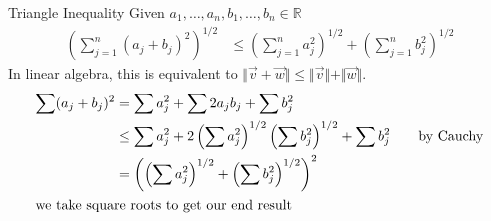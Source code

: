 \documentclass[10pt]{extarticle}
\newcommand{\R}{\mathbb{R}}
\begin{document}
  \begin{problem}{Triangle Inequality}
    Given $a_1,\dots,a_n,b_1,\dots,b_n\in\R$
    \begin{align*}
      \left(\sum_{j=1}^{n}(a_j + b_j)^2\right)^{1/2} &\leq \left(\sum_{j=1}^{n}a_j^2\right)^{1/2} + \left(\sum_{j=1}^{n}b_j^2\right)^{1/2}
    \end{align*}
    In linear algebra, this is equivalent to $\Vert\vec{v} + \vec{w}\Vert \leq \Vert\vec{v}\Vert + \Vert\vec{w}\Vert$.
    \tcblower
    \begin{align*}
      \sum (a_j + b_j)^2 &= \sum a_j^2 + \sum 2a_jb_j + \sum b_j^2\\
                         &\leq \sum a_j^2 + 2\left(\sum a_j^2\right)^{1/2}\left(\sum b_j^2\right)^{1/2} + \sum b_j^2\tag*{by Cauchy}\\
                         &= \left(\left(\sum a_j^2\right)^{1/2} + \left(\sum b_j^2\right)^{1/2} \right)^2\\
                         \shortintertext{we take square roots to get our end result}
    \end{align*}
  \end{problem}
\end{document}
